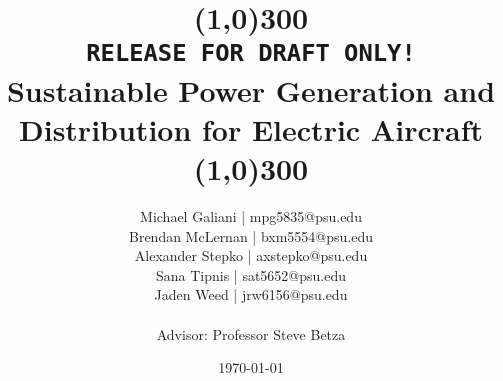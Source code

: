\documentclass[12pt]{article}
\title{\line(1,0){300}\\\texttt{RELEASE FOR DRAFT ONLY!}\\Sustainable Power Generation and Distribution for Electric Aircraft\\\line(1,0){300}}
\author{
    Michael Galiani | mpg5835@psu.edu\\
    Brendan McLernan | bxm5554@psu.edu\\
    Alexander Stepko | axstepko@psu.edu\\
    Sana Tipnis | sat5652@psu.edu\\
    Jaden Weed | jrw6156@psu.edu\\~\\
    Advisor: Professor Steve Betza
}
\affil{The Pennsylvania State University}
\date{\today}
\begin{document}
\begin{titlepage}
 \maketitle                   %
\end{titlepage}
\newpage
\raggedright
\parindent15pt



\newpage
\renewcommand\contentsname{Table of Contents} %
\tableofcontents %
\let\tableofcontents\relax

\newpage


\newpage


%

%

\newpage


\clearpage
{}%
\renewcommand*{\thepage}{A\arabic{page}}

\newpage

\end{document}
